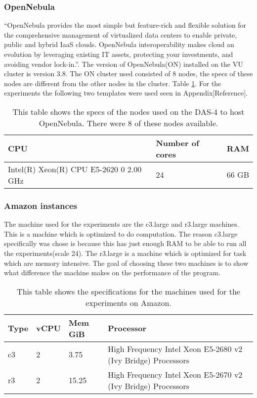 \subsubsection{OpenNebula}
\label{hw:opennebula}
``OpenNebula  provides the most simple but feature-rich and flexible solution for the comprehensive management of virtualized data centers to enable private, public and hybrid IaaS clouds. OpenNebula interoperability makes cloud an evolution by leveraging existing IT assets, protecting your investments, and avoiding vendor lock-in.''\cite{opennebula}. The version of OpenNebula(ON) installed on the VU cluster is version 3.8. The ON cluster used consisted of 8 nodes, the specs of these nodes are different from the other nodes in the cluster. Table \ref{tab:specs-opennebula}. For the experiments the following two templates were used seen in Appendix[Reference].
\begin{table} [!h]
	\begin{center}
	\begin{tabular}{|l|l|l|}
		\hline
		CPU & Number of cores & RAM  \\ \hline
		Intel(R) Xeon(R) CPU E5-2620 0 2.00 GHz & 24 & 66 GB\\ \hline
	\end{tabular}
	\caption{This table shows the specs of the nodes used on the DAS-4 to host OpenNebula. There were 8 of these nodes available.}
	\label{tab:specs-opennebula}
	\end{center}
\end{table}

\subsubsection{Amazon instances}
\label{hw:Amazon}
The machine used for the experiments are the c3.large and r3.large machines. This is a machine which is optimized to do computation. The reason c3.large specifically was chose is because this has just enough RAM to be able to run all the experiments(scale 24). The r3.large is a machine which is optimized for task which are memory intensive. The goal of choosing these two machines is to show what difference the machine makes on the performance of the program.

\begin{table}[!h]
\begin{center}
\begin{tabular}{|l|l|l|l|}
\hline
Type & vCPU & Mem GiB & Processor \\ \hline
c3 & 2 & 3.75 & High Frequency Intel Xeon E5-2680 v2 (Ivy Bridge) Processors \\ \hline
r3 & 2 & 15.25 & High Frequency Intel Xeon E5-2670 v2 (Ivy Bridge) Processors \\ \hline
\end{tabular}
\end{center}
\caption{This table shows  the specifications for the machines used for the experiments on Amazon.}
\label{tab:specs-amazong}
\end{table}

